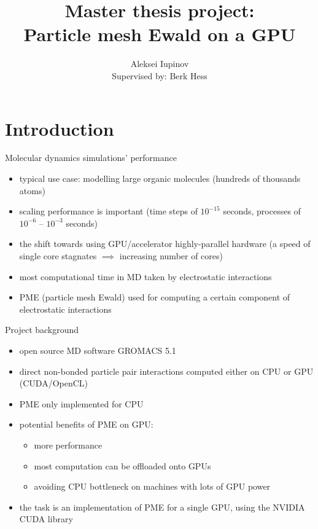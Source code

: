 \documentclass[11pt]{beamer}
\author[Aleksei Iupinov]{Aleksei Iupinov \\{\footnotesize Supervised by: Berk Hess}}
\title{Master thesis project: \\Particle mesh Ewald on a GPU}
\institute{KTH Royal Institute of Technology}
\begin{document}
\captionsetup[figure]{labelformat=empty}

\begin{frame}
\titlepage
\end{frame}


\section{Introduction}
\begin{frame}{Molecular dynamics simulations' performance}
\begin{itemize}
\item typical use case: modelling large organic molecules (hundreds of thousands atoms)
\item scaling performance is important (time steps of $10^{-15}$ seconds, processes of $10^{-6}$ -- $10^{-3}$ seconds) 
\item the shift towards using GPU/accelerator highly-parallel hardware (a speed of single core stagnates $\implies$ increasing number of cores)
\item most computational time in MD taken by electrostatic interactions
\item PME (particle mesh Ewald) used for computing a certain component of electrostatic interactions
\end{itemize}
\end{frame}

\begin{frame}{Project background}
\begin{itemize}
\item open source MD software GROMACS 5.1
\item direct non-bonded particle pair interactions computed either on CPU or GPU (CUDA/OpenCL) 
\item PME only implemented for CPU
\item potential benefits of PME on GPU:
\begin{itemize}
\item more performance
\item most computation can be offloaded onto GPUs
\item avoiding CPU bottleneck on machines with lots of GPU power  
\end{itemize}
\item the task is an implementation of PME for a single GPU, using the NVIDIA CUDA library 
\end{itemize}
\end{frame}
\end{document}
